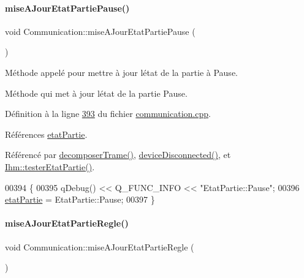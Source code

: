 \paragraph{\texorpdfstring{mise\+A\+Jour\+Etat\+Partie\+Pause()}{miseAJourEtatPartiePause()}}
{\footnotesize\ttfamily void Communication\+::mise\+A\+Jour\+Etat\+Partie\+Pause (\begin{DoxyParamCaption}{ }\end{DoxyParamCaption})}



Méthode appelé pour mettre à jour l\textquotesingle{}état de la partie à Pause. 

Méthode qui met à jour l\textquotesingle{}état de la partie Pause. 

Définition à la ligne \hyperlink{communication_8cpp_source_l00393}{393} du fichier \hyperlink{communication_8cpp_source}{communication.\+cpp}.



Références \hyperlink{communication_8h_source_l00100}{etat\+Partie}.



Référencé par \hyperlink{communication_8cpp_source_l00188}{decomposer\+Trame()}, \hyperlink{communication_8cpp_source_l00353}{device\+Disconnected()}, et \hyperlink{ihm_8cpp_source_l00641}{Ihm\+::tester\+Etat\+Partie()}.


\begin{DoxyCode}
00394 \{
00395     qDebug() << Q\_FUNC\_INFO << \textcolor{stringliteral}{"EtatPartie::Pause"};
00396     \hyperlink{class_communication_a2539ded2780db2c732690c585c768c96}{etatPartie} = EtatPartie::Pause;
00397 \}
\end{DoxyCode}
\mbox{\label{class_communication_a01a86890468a8ecfb900bf15dcab92f2}} 
\paragraph{\texorpdfstring{mise\+A\+Jour\+Etat\+Partie\+Regle()}{miseAJourEtatPartieRegle()}}
{\footnotesize\ttfamily void Communication\+::mise\+A\+Jour\+Etat\+Partie\+Regle (\begin{DoxyParamCaption}{ }\end{DoxyParamCaption})}



